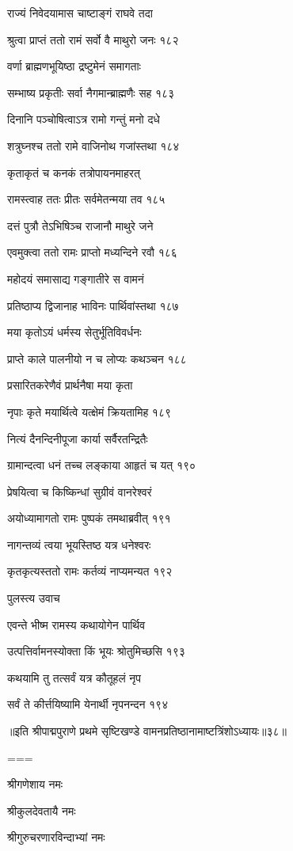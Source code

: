 राज्यं निवेदयामास चाष्टाङ्गं राघवे तदा

श्रुत्वा प्राप्तं ततो रामं सर्वो वै माथुरो जनः १८२

वर्णा ब्राह्मणभूयिष्ठा द्रष्टुमेनं समागताः

सम्भाष्य प्रकृतीः सर्वा नैगमान्ब्राह्मणैः सह १८३

दिनानि पञ्चोषित्वाऽत्र रामो गन्तुं मनो दधे

शत्रुघ्नश्च ततो रामे वाजिनोथ गजांस्तथा १८४

कृताकृतं च कनकं तत्रोपायनमाहरत्

रामस्त्वाह ततः प्रीतः सर्वमेतन्मया तव १८५

दत्तं पुत्रौ तेऽभिषिञ्च राजानौ माथुरे जने

एवमुक्त्वा ततो रामः प्राप्तो मध्यन्दिने रवौ १८६

महोदयं समासाद्य गङ्गातीरे स वामनं

प्रतिष्ठाप्य द्विजानाह भाविनः पार्थिवांस्तथा १८७

मया कृतोऽयं धर्मस्य सेतुर्भूतिविवर्धनः

प्राप्ते काले पालनीयो न च लोप्यः कथञ्चन १८८

प्रसारितकरेणैवं प्रार्थनैषा मया कृता

नृपाः कृते मयार्थित्वे यत्क्षेमं क्रियतामिह १८९

नित्यं दैनन्दिनीपूजा कार्या सर्वैरतन्द्रितैः

ग्रामान्दत्वा धनं तच्च लङ्काया आहृतं च यत् १९०

प्रेषयित्वा च किष्किन्धां सुग्रीवं वानरेश्वरं

अयोध्यामागतो रामः पुष्पकं तमथाब्रवीत् १९१

नागन्तव्यं त्वया भूयस्तिष्ठ यत्र धनेश्वरः

कृतकृत्यस्ततो रामः कर्तव्यं नाप्यमन्यत १९२

पुलस्त्य उवाच

एवन्ते भीष्म रामस्य कथायोगेन पार्थिव

उत्पत्तिर्वामनस्योक्ता किं भूयः श्रोतुमिच्छसि १९३

कथयामि तु तत्सर्वं यत्र कौतूहलं नृप

सर्वं ते कीर्त्तयिष्यामि येनार्थी नृपनन्दन १९४ 

॥इति श्रीपाद्मपुराणे प्रथमे सृष्टिखण्डे वामनप्रतिष्ठानामाष्टत्रिंशोऽध्यायः॥३८॥


===



श्रीगणेशाय नमः

श्रीकुलदेवतायै नमः

श्रीगुरुचरणारविन्दाभ्यां नमः

